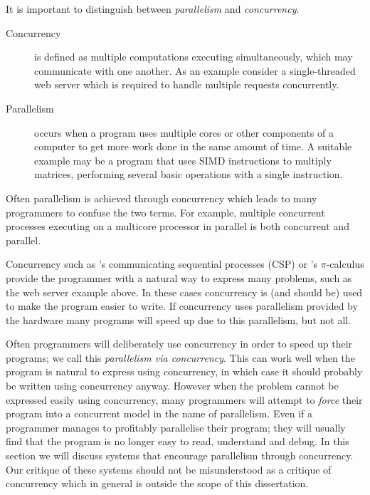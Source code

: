 It is important to distinguish between \emph{parallelism} and
\emph{concurrency}.

\begin{description}
    \item[Concurrency] is defined as multiple computations executing simultaneously,
    which may communicate with one another.
    As an example consider a single-threaded web server which is required to
    handle multiple requests concurrently.

    \item[Parallelism] occurs when a program uses multiple cores or other
    components of a computer to get more work done in the same amount of
    time.
    A suitable example may be a program that uses SIMD instructions to
    multiply matrices, performing several basic operations with a single
    instruction.
\end{description}

\noindent
Often parallelism is achieved through concurrency
which leads to many programmers to confuse the two terms.
For example,
multiple concurrent processes executing on a multicore processor in parallel
is both concurrent and parallel.

Concurrency such as \citet*{hoare:1978:csp}'s
communicating sequential processes (CSP)
or \citet*{milner:pi}'s $\pi$-calculus
provide the programmer with a natural way to express many problems,
such as the web server example above.
In these cases concurrency is (and should be) used to make the program
easier to write.
If concurrency uses parallelism provided by the hardware many programs
will speed up due to this parallelism,
but not all.

Often programmers will deliberately use concurrency in order to speed up
their programs;
we call this \emph{parallelism via concurrency}.
This can work well when the program is natural to express using concurrency,
in which case it should probably be written using concurrency anyway.
However when the problem cannot be expressed easily using concurrency,
many programmers will attempt to \emph{force} their program into a concurrent
model in the name of parallelism.
Even if a programmer manages to profitably parallelise their program;
they will usually find that the program is no longer easy to read, understand
and debug.
In this section we will discuss systems that encourage parallelism through
concurrency.
Our critique of these systems should not be misunderstood as a critique of
concurrency which in general is outside the scope of this dissertation.

